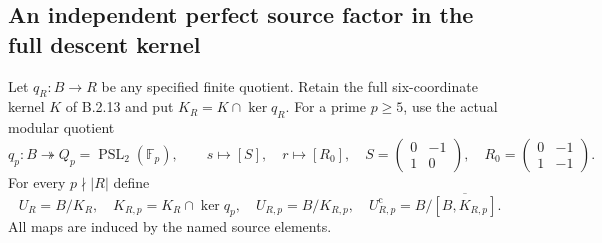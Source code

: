 \subsection{An independent perfect source factor in the full descent kernel}

Let $q_R:B\to R$ be any specified finite quotient.  Retain
the full six-coordinate kernel $K$ of B.2.13 and put
$K_R=K\cap\ker q_R$.  For a prime $p\geq5$, use the
actual modular quotient
\[
 q_p:B\twoheadrightarrow Q_p=\operatorname{PSL}_2(\mathbb F_p),
 \qquad s\longmapsto[S],\quad r\longmapsto[R_0],
 \quad
 S=\begin{pmatrix}0&-1\\1&0\end{pmatrix},\quad
 R_0=\begin{pmatrix}0&-1\\1&-1\end{pmatrix}.
 \tag{B.AB1}
\]
For every $p\nmid|R|$ define
\[
 U_R=B/K_R,\quad K_{R,p}=K_R\cap\ker q_p,\quad
 U_{R,p}=B/K_{R,p},\quad
 U_{R,p}^{\mathrm c}=B/\overline{[B,K_{R,p}]}.
 \tag{B.AB2}
\]
All maps are induced by the named source elements.

